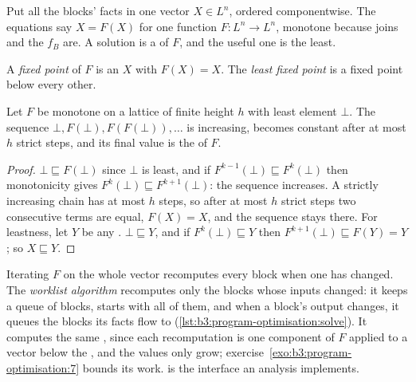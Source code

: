 Put all the blocks' facts in one vector $X \in L^n$, ordered componentwise. The equations say $X = F(X)$ for one function $F : L^n \to L^n$, monotone because joins and the $f_B$ are. A solution is a  of $F$, and the useful one is the least.

\begin{definition}\label{def:b3:program-optimisation:lfp}
A \emph{fixed point} of $F$ is an $X$ with $F(X) = X$. The \emph{least fixed point} is a fixed point below every other.
\end{definition}

\begin{theorem}\label{thm:b3:program-optimisation:kleene}
Let $F$ be monotone on a lattice of finite height $h$ with least element $\bot$. The sequence $\bot, F(\bot), F(F(\bot)), \dots$ is increasing, becomes constant after at most $h$ strict steps, and its final value is the  of $F$.
\end{theorem}

\begin{proof}
$\bot \sqsubseteq F(\bot)$ since $\bot$ is least, and if $F^{k-1}(\bot) \sqsubseteq F^{k}(\bot)$ then monotonicity gives $F^{k}(\bot) \sqsubseteq F^{k+1}(\bot)$: the sequence increases. A strictly increasing chain has at most $h$ steps, so after at most $h$ strict steps two consecutive terms are equal, $F(X) = X$, and the sequence stays there. For leastness, let $Y$ be any . $\bot \sqsubseteq Y$, and if $F^k(\bot) \sqsubseteq Y$ then $F^{k+1}(\bot) \sqsubseteq F(Y) = Y$; so $X \sqsubseteq Y$.
\end{proof}

Iterating $F$ on the whole vector recomputes every block when one has changed. The \emph{worklist algorithm} recomputes only the blocks whose inputs changed: it keeps a queue of blocks, starts with all of them, and when a block's output changes, it queues the blocks its facts flow to (\cref{lst:b3:program-optimisation:solve}). It computes the same , since each recomputation is one component of $F$ applied to a vector below the , and the values only grow; exercise~\ref{exo:b3:program-optimisation:7} bounds its work.  is the interface an analysis implements.

